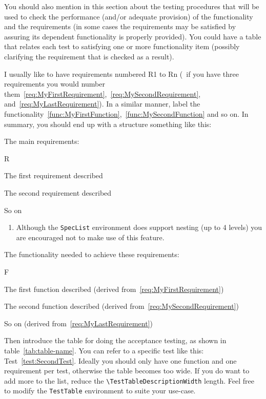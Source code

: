 You should also mention in this section about the testing procedures that will be used to check the performance (and/or adequate provision) of the functionality and the requirements (in some cases the requirements may be satisfied by assuring its dependent functionality is properly provided). You could have a table that relates each test to satisfying one or more functionality item (possibly clarifying the requirement that is checked as a result).

I usually like to have requirements numbered R1 to Rn (\ie~if you have three requirements you would number them~\ref{req:MyFirstRequirement},~\ref{req:MySecondRequirement}, and~\ref{req:MyLastRequirement}). In a similar manner, label the functionality~\ref{func:MyFirstFunction},~\ref{func:MySecondFunction} and so on.
In summary, you should end up with a structure something like this:

The main requirements:

\begin{SpecList}{R}
  \item \label{req:MyFirstRequirement}  The first requirement described
  \item \label{req:MySecondRequirement} The second requirement described
  \item \label{req:MyLastRequirement}   So on
  \begin{enumerate}
    \item Although the \verb|SpecList| environment does support nesting (up to 4 levels) you are encouraged not to make use of this feature.
  \end{enumerate}
\end{SpecList}

The functionality needed to achieve these requirements:

\begin{SpecList}{F}
  \item \label{func:MyFirstFunction}  The first function described (derived from~\ref{req:MyFirstRequirement})
  \item \label{func:MySecondFunction} The second function described (derived from~\ref{req:MySecondRequirement})
  \item \label{func:MyLastFunction}   So on (derived from~\ref{req:MyLastRequirement})
\end{SpecList}

Then introduce the table for doing the acceptance testing, as shown in table~\ref{tab:table-name}.  You can refer to a specific test like this: Test~\ref{test:SecondTest}.  Ideally you should only have one function and one requirement per test, otherwise the table becomes too wide.  If you do want to add more to the list, reduce the \verb|\TestTableDescriptionWidth| length.  Feel free to modify the \verb|TestTable| environment to suite your use-case.

